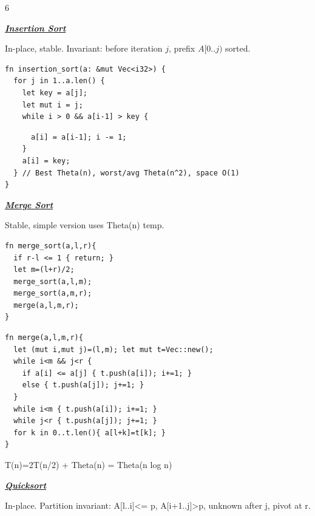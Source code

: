 \documentclass[a4paper,landscape]{article}
\renewcommand{\textbf}[1]{\underline{#1}}
\newcommand{\subsectionsize}{\fontsize{3.92}{4.02}\selectfont}
\newcommand{\subsectiontitle}[1]{%
  \par\vspace{0pt}%
  {\subsectionsize\bfseries\itshape\textbf{#1}}\par%
  \vspace{0pt}%
}
\begin{document}
\begin{multicols*}{6}
\subsectiontitle{Insertion Sort}
In-place, stable. Invariant: before iteration $j$, prefix $A[0..j)$ sorted.\\
\begin{minipage}[t]{0.38\linewidth}\vspace{0pt}
\begin{lstlisting}
fn insertion_sort(a: &mut Vec<i32>) {
  for j in 1..a.len() {
    let key = a[j];
    let mut i = j;
    while i > 0 && a[i-1] > key {
\end{lstlisting}
\end{minipage}\hfill
\begin{minipage}[t]{0.38\linewidth}\vspace{0pt}
\begin{lstlisting}
      a[i] = a[i-1]; i -= 1;
    }
    a[i] = key;
  } // Best Theta(n), worst/avg Theta(n^2), space O(1)
}
\end{lstlisting}
\end{minipage}
\subsectiontitle{Merge Sort}
Stable, simple version uses Theta(n) temp.\\
\noindent
\begin{minipage}[t]{0.38\linewidth}\vspace{0pt}
\begin{lstlisting}[aboveskip=0pt,belowskip=0pt]
fn merge_sort(a,l,r){
  if r-l <= 1 { return; }
  let m=(l+r)/2;
  merge_sort(a,l,m);
  merge_sort(a,m,r);
  merge(a,l,m,r);
}
\end{lstlisting}
\end{minipage}\hfill
\begin{minipage}[t]{0.60\linewidth}\vspace{0pt}
\begin{lstlisting}[aboveskip=0pt,belowskip=0pt]
fn merge(a,l,m,r){
  let (mut i,mut j)=(l,m); let mut t=Vec::new();
  while i<m && j<r {
    if a[i] <= a[j] { t.push(a[i]); i+=1; }
    else { t.push(a[j]); j+=1; }
  }
  while i<m { t.push(a[i]); i+=1; }
  while j<r { t.push(a[j]); j+=1; }
  for k in 0..t.len(){ a[l+k]=t[k]; }
}
\end{lstlisting}
\end{minipage}
T(n)=2T(n/2) + Theta(n) = Theta(n log n)
\subsectiontitle{Quicksort}
In-place. Partition invariant: A[l..i]<= p, A[i+1..j]>p, unknown after j, pivot at r.\\
\noindent
\begin{minipage}[t]{0.49\linewidth}\vspace{0pt}

\end{minipage}
\end{multicols*}
\end{document}
